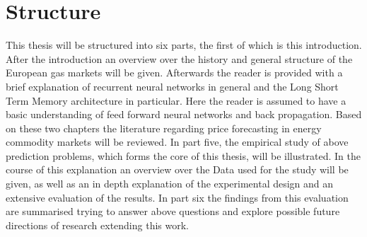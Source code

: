 \section{Structure}
This thesis will be structured into six parts, the first of which is this introduction. After the introduction an overview over the history and general structure of the European gas markets will be given. Afterwards the reader is provided with a brief explanation of recurrent neural networks in general and the Long Short Term Memory architecture in particular. Here the reader is assumed to have a basic understanding of feed forward neural networks and back propagation. Based on these two chapters  the literature regarding price forecasting in energy commodity markets will be reviewed. In part five, the empirical study of above prediction problems, which forms the core of this thesis, will be illustrated. In the course of this explanation an overview over the Data used for the study will be given, as well as an in depth explanation of the experimental design and an extensive evaluation of the results. In part six the findings from this evaluation are summarised trying to answer above questions and explore possible future directions of research extending this work. 